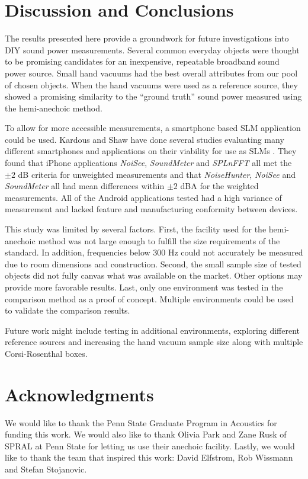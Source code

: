 \documentclass[letterpaper,12pt]{article}
\begin{document}
\clearpage
\section{Discussion and Conclusions}
The results presented here provide a groundwork for future investigations into DIY sound power measurements. Several common everyday objects were thought to be promising candidates for an inexpensive, repeatable broadband sound power source.  Small hand vacuums had the best overall attributes from our pool of chosen objects. When the hand vacuums were used as a reference source, they showed a promising similarity to the ``ground truth'' sound power measured using the hemi-anechoic method.

To allow for more accessible measurements, a smartphone based SLM application could be used.  Kardous and Shaw have done several studies evaluating many different smartphones and applications on their viability for use as SLMs \cite{kardous2014evaluation, kardous2015sound, kardous2016evaluation}. They found that iPhone applications \textit{NoiSee}, \textit{SoundMeter} and \textit{SPLnFFT} all met the $\pm2$ dB criteria for unweighted measurements and that \textit{NoiseHunter}, \textit{NoiSee} and \textit{SoundMeter} all had mean differences within $\pm2$ dBA for the weighted measurements. All of the Android applications tested had a high variance of measurement and lacked feature and manufacturing conformity between devices.

This study was limited by several factors. First, the facility used for the hemi-anechoic method was not large enough to fulfill the size requirements of the standard. In addition, frequencies below 300 Hz could not accurately be measured due to room dimensions and construction. Second, the small sample size of tested objects did not fully canvas what was available on the market. Other options may provide more favorable results. Last, only one environment was tested in the comparison method as a proof of concept. Multiple environments could be used to validate the comparison results.

Future work might include testing in additional environments, exploring different reference sources and increasing the hand vacuum sample size along with multiple Corsi-Rosenthal boxes. 

\noindent

\section*{Acknowledgments}
\noindent
We would like to thank the Penn State Graduate Program in Acoustics for funding this work. We would also like to thank Olivia Park and Zane Rusk of SPRAL at Penn State for letting us use their anechoic facility. Lastly, we would like to thank the team that inspired this work: David Elfstrom, Rob Wissmann and Stefan Stojanovic.

 
\end{document}
